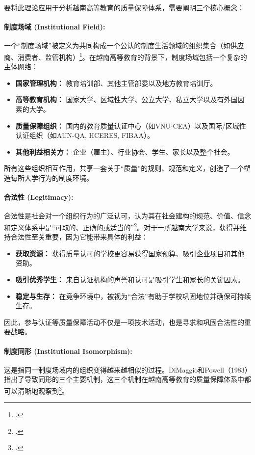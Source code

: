 要将此理论应用于分析越南高等教育的质量保障体系，需要阐明三个核心概念：

\paragraph{制度场域 (Institutional Field):}
一个“制度场域”被定义为共同构成一个公认的制度生活领域的组织集合（如供应商、消费者、监管机构）\footcite{DiMaggioPowell1983}。在越南高等教育的背景下，制度场域包括一个复杂的主体网络：
\begin{itemize}
    \item \textbf{国家管理机构：} 教育培训部、其他主管部委以及地方教育培训厅。
    \item \textbf{高等教育机构：} 国家大学、区域性大学、公立大学、私立大学以及有外国因素的大学。
    \item \textbf{质量保障组织：} 国内的教育质量认证中心（如VNU-CEA）以及国际/区域性认证组织（如AUN-QA, HCERES, FIBAA）。
    \item \textbf{其他利益相关方：} 企业（雇主）、行业协会、学生、家长以及整个社会。
\end{itemize}
所有这些组织相互作用，共享一套关于“质量”的规则、规范和定义，创造了一个塑造每所大学行为的制度环境。

\paragraph{合法性 (Legitimacy):}
合法性是社会对一个组织行为的广泛认可，认为其在社会建构的规范、价值、信念和定义体系中是“可取的、正确的或适当的”\footcite{Suchman1995}。对于一所越南大学来说，获得并维持合法性至关重要，因为它能带来具体的利益：
\begin{itemize}
    \item \textbf{获取资源：} 获得质量认可的学校更容易获得国家预算、吸引企业项目和其他资助。
    \item \textbf{吸引优秀学生：} 来自认证机构的声誉和认可是吸引学生和家长的关键因素。
    \item \textbf{稳定与生存：} 在竞争环境中，被视为“合法”有助于学校巩固地位并确保可持续生存。
\end{itemize}
因此，参与认证等质量保障活动不仅是一项技术活动，也是寻求和巩固合法性的重要战略。

\paragraph{制度同形 (Institutional Isomorphism):}
这是指同一制度场域内的组织变得越来越相似的过程。DiMaggio和Powell（1983）指出了导致同形的三个主要机制，这三个机制在越南高等教育的质量保障体系中都可以清晰地观察到\footcite{DiMaggioPowell1983}。

